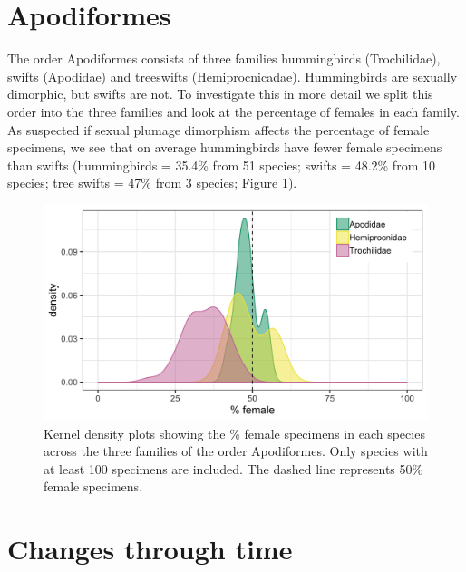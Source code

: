 \documentclass[a4paper, 12pt]{article}
\begin{document}
\newpage


\newpage
\section{Apodiformes}

The order Apodiformes consists of three families hummingbirds (Trochilidae), swifts (Apodidae) and treeswifts (Hemiprocnicadae).
Hummingbirds are sexually dimorphic, but swifts are not. 
To investigate this in more detail we split this order into the three families and look at the percentage of females in each family. 
As suspected if sexual plumage dimorphism affects the percentage of female specimens, we see that on average hummingbirds have fewer female specimens than swifts (hummingbirds = 35.4\% from 51 species; swifts = 48.2\% from 10 species; tree swifts = 47\% from 3 species; Figure \ref{fig-apod}).

\begin{figure}[H]
 \centering
  \includegraphics[width = \linewidth]{figures/apodiforme-families.png}
  \caption{Kernel density plots showing the \% female specimens in each species across the three families of the order Apodiformes. 
  Only species with at least 100 specimens are included. 
  The dashed line represents 50\% female specimens. 
}
  \label{fig-apod}
\end{figure}

\newpage
\section{Changes through time}
\end{document}
